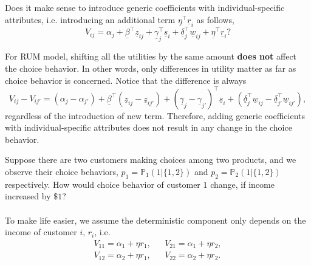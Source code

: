 \documentclass[11pt]{article}
\newcommand{\prob}{\ensuremath{\mathbb{P}}}
\newenvironment{example}[2][Example]{\begin{trivlist}
\item[\hskip \labelsep {\bfseries #1}\hskip \labelsep {\bfseries #2.}]}{\end{trivlist}}
\begin{document}
\begin{enumerate}
\item Does it make sense to introduce generic coefficients with individual-specific attributes, i.e. introducing an additional term $\underline{\eta}^\top \underline{r}_i$ as follows,
\begin{equation*}
V_{ij} = \alpha_j + \underline{\beta}^\top \underline{z}_{ij} + \underline{\gamma}_j^\top \underline{s}_i + \underline{\delta}_j^\top \underline{w}_{ij} + \underline{\eta}^\top \underline{r}_i ?
\end{equation*}

For RUM model, shifting all the utilities by the same amount \textbf{does not} affect the choice behavior. In other words, only differences in utility matter as far as choice behavior is concerned. Notice that the difference is always
\begin{equation*}
V_{ij} - V_{ij'}= (\alpha_j - \alpha_{j'}) + \underline{\beta}^\top (\underline{z}_{ij} - \underline{z}_{ij'}) + (\underline{\gamma}_j - \underline{\gamma}_{j'})^\top \underline{s}_i + (\underline{\delta}_j^\top \underline{w}_{ij} - \underline{\delta}_{j'}^\top \underline{w}_{ij'}),
\end{equation*}
regardless of the introduction of new term. Therefore, adding generic coefficients with individual-specific attributes does not result in any change in the choice behavior. 
\begin{example}[Example]1
Suppose there are two customers making choices among two products, and we observe their choice behaviors, $p_1 = \prob_1(1|\{1,2\})$ and $p_2 = \prob_2(1|\{1,2\})$ respectively. How would choice behavior of customer $1$ change, if income increased by $\$ 1$?\\ \\
To make life easier, we assume the deterministic component only depends on the income of customer $i$, $r_i$, i.e.
\begin{align*}
V_{11} = \alpha_1 + \eta r_1, && V_{21} = \alpha_1 + \eta r_2,\\
V_{12} = \alpha_2 + \eta r_1, && V_{22} = \alpha_2 + \eta r_2.
\end{align*}


\end{example}
\end{enumerate}
\end{document}

